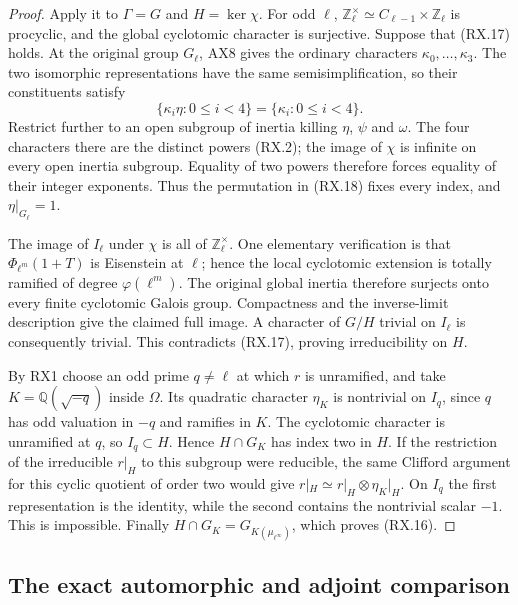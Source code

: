 \begin{proof}
Apply it to $\Gamma=G$ and $H=\ker\chi$.
For odd $\ell$,
$\mathbb Z_\ell^\times\simeq C_{\ell-1}\times\mathbb Z_\ell$
is procyclic, and the global cyclotomic character is surjective.
Suppose that (RX.17) holds.  At the original group $G_\ell$,
AX8 gives the ordinary characters $\kappa_0,\ldots,\kappa_3$.
The two isomorphic representations have the same semisimplification,
so their constituents satisfy
\[
               \{\kappa_i\eta:0\le i<4\}
                       =\{\kappa_i:0\le i<4\}.
 \tag{RX.18}
\]
Restrict further to an open subgroup of inertia killing $\eta$,
$\psi$ and $\omega$.  The four characters there are the distinct
powers (RX.2); the image of $\chi$ is infinite on every open
inertia subgroup.  Equality of two powers therefore forces equality
of their integer exponents.  Thus the permutation in (RX.18)
fixes every index, and $\eta|_{G_\ell}=1$.

The image of $I_\ell$ under $\chi$ is all of
$\mathbb Z_\ell^\times$.  One elementary verification is that
$\Phi_{\ell^m}(1+T)$ is Eisenstein at $\ell$; hence the local
cyclotomic extension is totally ramified of degree
$\varphi(\ell^m)$.  The original global inertia therefore surjects
onto every finite cyclotomic Galois group.  Compactness and the
inverse-limit description give the claimed full image.
A character of $G/H$ trivial on $I_\ell$ is consequently trivial.
This contradicts (RX.17), proving irreducibility on $H$.

By RX1 choose an odd prime $q\ne\ell$ at which $r$ is unramified,
and take $K=\mathbb Q(\sqrt{-q})$ inside $\Omega$.
Its quadratic character $\eta_K$ is nontrivial on $I_q$, since
$q$ has odd valuation in $-q$ and ramifies in $K$.
The cyclotomic character is unramified at $q$, so $I_q\subset H$.
Hence $H\cap G_K$ has index two in $H$.
If the restriction of the irreducible $r|_H$ to this subgroup were
reducible, the same Clifford argument for this cyclic quotient of
order two would give
$r|_H\simeq r|_H\otimes\eta_K|_H$.
On $I_q$ the first representation is the identity, while the second
contains the nontrivial scalar $-1$.  This is impossible.
Finally $H\cap G_K=G_{K(\mu_{\ell^\infty})}$, which proves
(RX.16).
\end{proof}

\subsection{The exact automorphic and adjoint comparison}

